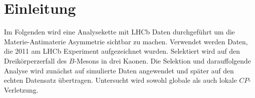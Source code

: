 \section{Einleitung}
\label{sec:einleitung}
Im Folgenden wird eine Analysekette mit LHCb Daten durchgef\"uhrt um die Materie-Antimaterie Asymmetrie sichtbar zu machen.
Verwendet werden Daten, die 2011 am LHCb Experiment aufgezeichnet wurden. Selektiert wird auf den 
Dreikörperzerfall des $B$-Mesons in drei Kaonen. Die Selektion und darauffolgende 
Analyse wird zunächst auf simulierte Daten angewendet und später auf den echten 
Datensatz übertragen. Untersucht wird sowohl globale als auch lokale $CP$-Verletzung.
